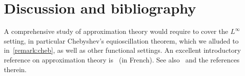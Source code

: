 \section{Discussion and bibliography}
A comprehensive study of approximation theory would require to cover the $L^{\infty}$ setting,
in particular Chebyshev's equioscillation theorem, which we alluded to in~\cref{remark:cheb},
as well as other functional settings.
An excellent introductory reference on approximation theory is~\cite{magnus} (in French).
See also~\cite[Chapter 10]{MR2265914} and the references therein.
